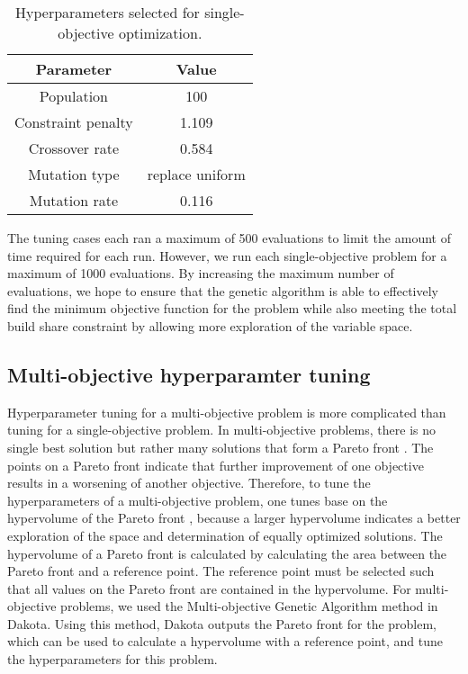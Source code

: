 \begin{table}
    \centering
    \caption{Hyperparameters selected for single-objective optimization.}
    \label{tab:soga_parameters}
    \begin{tabular}{c c}
        \hline
        Parameter & Value \\
        \hline
        Population & 100 \\
        Constraint penalty & 1.109\\
        Crossover rate & 0.584\\
        Mutation type & replace uniform\\
        Mutation rate & 0.116\\
        \hline
    \end{tabular}
\end{table}

The tuning cases each ran a maximum of 500 evaluations to limit the 
amount of time required for each run. However, we run each 
single-objective problem for a maximum of 1000 evaluations. By 
increasing the maximum number of evaluations, we hope to ensure that 
the genetic algorithm is able to effectively find the minimum objective 
function for the problem while also meeting the total build share 
constraint by allowing more exploration of the variable space. 

\subsection{Multi-objective hyperparamter tuning}
Hyperparameter tuning for a multi-objective problem is more complicated 
than tuning for a single-objective problem. In multi-objective 
problems, there is no single best solution but rather many solutions 
that form a Pareto front \cite{adams_dakota_2021}. The points on a 
Pareto front indicate that further improvement of one objective 
results in a worsening of another objective. Therefore, to tune the 
hyperparameters of a multi-objective problem, one tunes base on the 
hypervolume of the Pareto front \cite{deb_multi-objective_2001}, because 
a larger hypervolume indicates a better exploration of the space and 
determination of equally optimized solutions. The 
hypervolume of a Pareto front is calculated by calculating the area 
between the Pareto front and a reference point. The reference point 
must be selected such that all values on the Pareto front are contained in 
the hypervolume. For multi-objective problems, we used the 
Multi-objective Genetic Algorithm method 
in Dakota. Using this method, Dakota
outputs the Pareto front for the problem, which can be used to calculate 
a hypervolume with a reference point, and 
tune the hyperparameters for this problem. 

